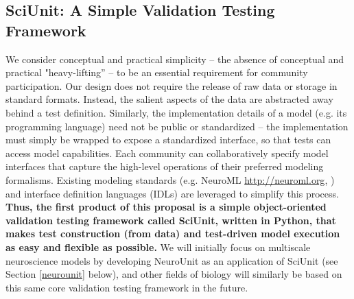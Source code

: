 \documentclass[11pt,letterpaper]{article}
\begin{document}
\subsection{SciUnit: A Simple Validation Testing Framework}
We consider conceptual and practical simplicity -- the absence of conceptual and practical "heavy-lifting'' -- to be an essential requirement for community participation. Our design does not require the release of raw data or storage in standard formats. Instead, the salient aspects of the data are abstracted away behind a test definition. Similarly, the implementation details of a model (e.g. its programming language) need not be public or standardized -- the implementation must simply be wrapped to expose a standardized interface, so that tests can access model capabilities. Each community can collaboratively specify model interfaces that capture the high-level operations of their preferred modeling formalisms. Existing modeling standards (e.g. NeuroML \url{http://neuroml.org}, \cite{gleeson2010}) and interface definition languages (IDLs) \cite{bachmann2008} are leveraged to simplify this process. \textbf{Thus, the first product of this proposal is a simple object-oriented validation testing framework called \textbf{SciUnit}, written in Python, that makes test construction (from data) and test-driven model execution as easy and flexible as possible.} We will initially focus on multiscale neuroscience models by developing NeuroUnit as an application of SciUnit (see Section \ref{neurounit} below), and other fields of biology will similarly be based on this same core validation testing framework in the future. 
\end{document}
